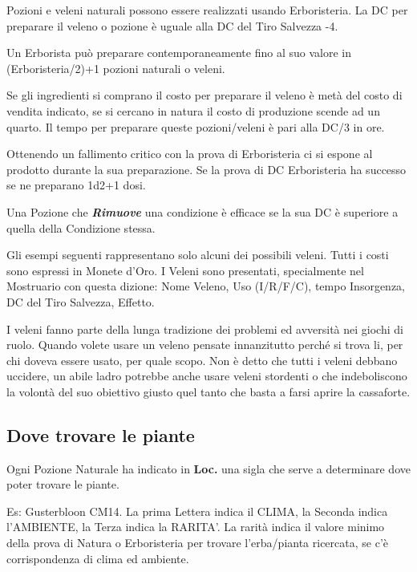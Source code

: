 \begin{multicols}{2}
Pozioni e veleni naturali possono essere realizzati usando Erboristeria. La DC per preparare il veleno o pozione è uguale alla DC del Tiro Salvezza -4.

Un Erborista può preparare contemporaneamente fino al suo valore in (Erboristeria/2)+1 pozioni naturali o veleni.

Se gli ingredienti si comprano il costo per preparare il veleno è metà del costo di vendita indicato, se si cercano in natura il costo di produzione scende ad un quarto. Il tempo per preparare queste pozioni/veleni è pari alla DC/3 in ore. 

Ottenendo un fallimento critico con la prova di Erboristeria ci si espone al prodotto durante la sua preparazione. Se la prova di DC Erboristeria ha successo se ne preparano 1d2+1 dosi.

Una Pozione che \emph{\textbf{Rimuove}} una condizione è efficace se la sua DC è superiore a quella della Condizione stessa. 

Gli esempi seguenti rappresentano solo alcuni dei possibili veleni. Tutti i costi sono espressi in Monete d'Oro. I Veleni sono presentati, specialmente nel Mostruario con questa dizione: Nome Veleno, Uso (I/R/F/C), tempo Insorgenza, DC del Tiro Salvezza, Effetto.

\begin{changemargin}{0.3cm}{0.3cm}\begin{narratore}
I veleni fanno parte della lunga tradizione dei problemi ed avversità nei giochi di ruolo. Quando volete usare un veleno pensate innanzitutto perché si trova li, per chi doveva essere usato, per quale scopo. Non è detto che tutti i veleni debbano uccidere, un abile ladro potrebbe anche usare veleni stordenti o che indeboliscono la volontà del suo obiettivo giusto quel tanto che basta a farsi aprire la cassaforte.
\end{narratore}\end{changemargin}

\subsection{Dove trovare le piante}

Ogni Pozione Naturale ha indicato in \textbf{Loc.} una sigla che serve a determinare dove poter trovare le piante.

Es: Gusterbloon CM14. La prima Lettera indica il CLIMA, la Seconda indica l'AMBIENTE, la Terza indica la RARITA'. La rarità indica il valore minimo della prova di Natura o Erboristeria per trovare l'erba/pianta ricercata, se c'è corrispondenza di clima ed ambiente.


\end{multicols}

